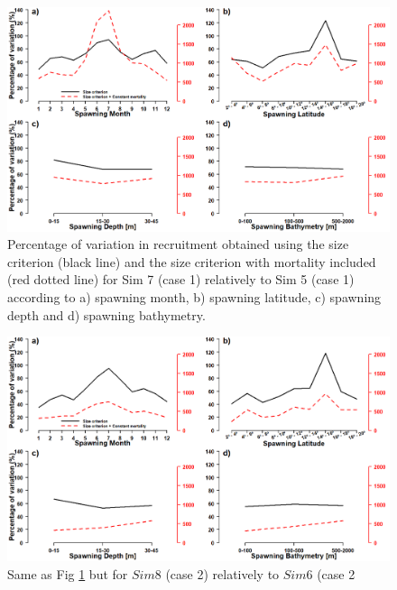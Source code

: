 \begin{figure}[H]
	\includegraphics[width=1.0\textwidth]{figures/Chap3Case1f1.png}
	\centering
	\caption{Percentage of variation in recruitment obtained using the size criterion (black line) and the size criterion with mortality included (red dotted line) for Sim 7 (case 1) relatively to Sim 5 (case 1) according to a) spawning month, b) spawning latitude, c) spawning depth and d) spawning bathymetry.}
	\label{Chap3Case1f1}
\end{figure}

\begin{figure}[H]
	\includegraphics[width=1.0\textwidth]{figures/Chap3Case2f1.png}
	\centering
	\caption{Same as Fig \ref{Chap3Case1f1} but for $Sim 8$ (case 2) relatively to $Sim 6$ (case 2}
	\label{Chap3Case2f1}
\end{figure}


